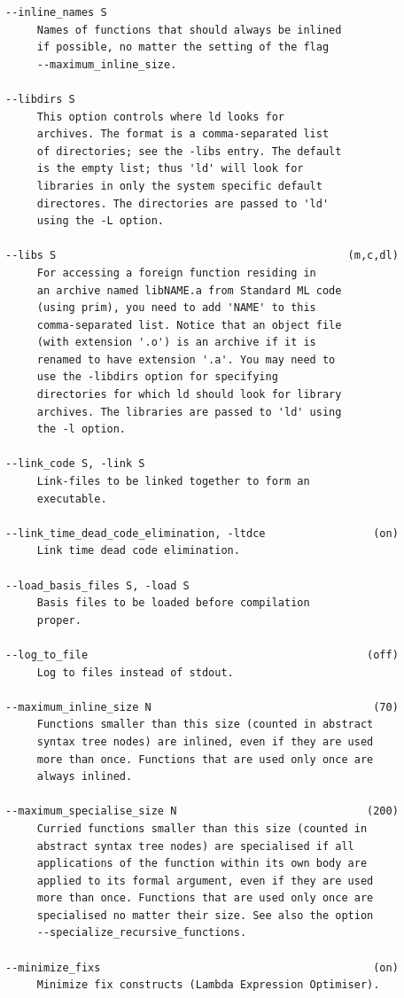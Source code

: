 \documentclass[12pt]{book}
\begin{document}
\begin{verbatim}
--inline_names S
     Names of functions that should always be inlined
     if possible, no matter the setting of the flag
     --maximum_inline_size.

--libdirs S
     This option controls where ld looks for
     archives. The format is a comma-separated list
     of directories; see the -libs entry. The default
     is the empty list; thus 'ld' will look for
     libraries in only the system specific default
     directores. The directories are passed to 'ld'
     using the -L option.

--libs S                                              (m,c,dl)
     For accessing a foreign function residing in
     an archive named libNAME.a from Standard ML code
     (using prim), you need to add 'NAME' to this
     comma-separated list. Notice that an object file
     (with extension '.o') is an archive if it is
     renamed to have extension '.a'. You may need to
     use the -libdirs option for specifying
     directories for which ld should look for library
     archives. The libraries are passed to 'ld' using
     the -l option.

--link_code S, -link S
     Link-files to be linked together to form an
     executable.

--link_time_dead_code_elimination, -ltdce                 (on)
     Link time dead code elimination.

--load_basis_files S, -load S
     Basis files to be loaded before compilation
     proper.

--log_to_file                                            (off)
     Log to files instead of stdout.

--maximum_inline_size N                                   (70)
     Functions smaller than this size (counted in abstract
     syntax tree nodes) are inlined, even if they are used
     more than once. Functions that are used only once are
     always inlined.

--maximum_specialise_size N                              (200)
     Curried functions smaller than this size (counted in
     abstract syntax tree nodes) are specialised if all
     applications of the function within its own body are
     applied to its formal argument, even if they are used
     more than once. Functions that are used only once are
     specialised no matter their size. See also the option
     --specialize_recursive_functions.

--minimize_fixs                                           (on)
     Minimize fix constructs (Lambda Expression Optimiser).


\end{verbatim}
\end{document}
